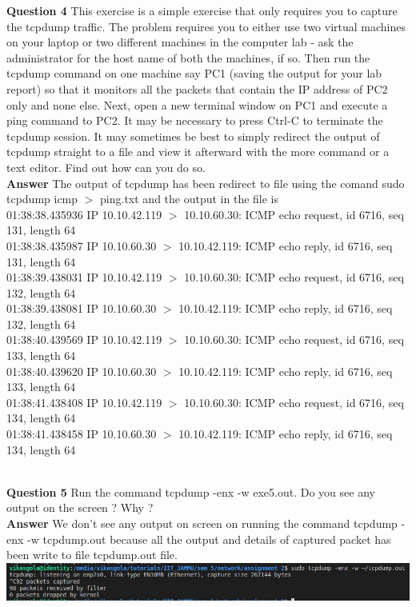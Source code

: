 \documentclass[14pt]{extarticle}
\begin{document}
    \noindent
    \textbf{\large Question 4}
    This exercise is a simple exercise that only requires you to capture the tcpdump traffic. The problem
requires you to either use two virtual machines on your laptop or two different machines in the computer
lab - ask the administrator for the host name of both the machines, if so. Then run the tcpdump command
on one machine say PC1 (saving the output for your lab report) so that it monitors all the packets that
contain the IP address of PC2 only and none else. Next, open a new terminal window on PC1 and execute
a ping command to PC2. It may be necessary to press Ctrl-C to terminate the tcpdump session. It may
sometimes be best to simply redirect the output of tcpdump straight to a file and view it afterward with
the more command or a text editor. Find out how can you do so.\\[10pt]
    \textbf{\large Answer}
    The output of tcpdump has been redirect to file using the comand \textsf{sudo tcpdump icmp $>$ ping.txt} and the output in the file is \\
    01:38:38.435936 IP 10.10.42.119 $>$ 10.10.60.30: ICMP echo request, id 6716, seq 131, length 64\\
    01:38:38.435987 IP 10.10.60.30 $>$ 10.10.42.119: ICMP echo reply, id 6716, seq 131, length 64\\
    01:38:39.438031 IP 10.10.42.119 $>$ 10.10.60.30: ICMP echo request, id 6716, seq 132, length 64\\
    01:38:39.438081 IP 10.10.60.30 $>$ 10.10.42.119: ICMP echo reply, id 6716, seq 132, length 64\\
    01:38:40.439569 IP 10.10.42.119 $>$ 10.10.60.30: ICMP echo request, id 6716, seq 133, length 64\\
    01:38:40.439620 IP 10.10.60.30 $>$ 10.10.42.119: ICMP echo reply, id 6716, seq 133, length 64\\
    01:38:41.438408 IP 10.10.42.119 $>$ 10.10.60.30: ICMP echo request, id 6716, seq 134, length 64\\
    01:38:41.438458 IP 10.10.60.30 $>$ 10.10.42.119: ICMP echo reply, id 6716, seq 134, length 64\\
    \\
    \vspace{1cm}

    \noindent
    \textbf{\large Question 5}
    Run the command tcpdump -enx -w exe5.out. Do you see any output on the screen ? Why ?\\[10pt]
    \textbf{\large Answer}
    We don't see any output on screen on running the command \textsf{tcpdump -enx -w tcpdump.out} because all the output and details of captured 
    packet has been write to file tcpdump.out file.\\[8pt]
    \includegraphics[scale=0.48]{5}
    \vspace{1cm}
\end{document}
